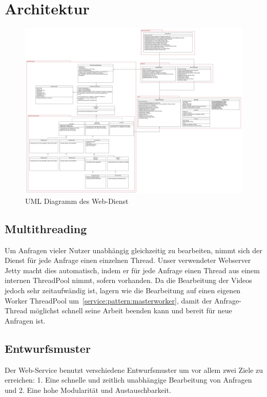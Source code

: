 \section{Architektur}

\begin{figure}[ht]
	\centering
\includegraphics[width=1\textwidth]{./resources/Diagramme/Webservice/UMLSERVERPCC.jpg}
\caption{UML Diagramm des Web-Dienst}
	\label{service:fig:modules_overview}
\end{figure}

\subsection{Multithreading}
Um Anfragen vieler Nutzer unabhängig gleichzeitig zu bearbeiten, nimmt sich der Dienst für jede Anfrage einen einzelnen Thread. Unser verwendeter Webserver Jetty macht dies automatisch, indem er für jede Anfrage einen Thread aus einem internen ThreadPool nimmt, sofern vorhanden.\newline
Da die Bearbeitung der Videos jedoch sehr zeitaufwändig ist, lagern wie die Bearbeitung auf einen eigenen Worker ThreadPool um~\eqref{service:pattern:masterworker}, damit der Anfrage-Thread möglichst schnell seine Arbeit beenden kann und bereit für neue Anfragen ist. 

\subsection{Entwurfsmuster} \label{service:pattern}
Der Web-Service benutzt verschiedene Entwurfsmuster um vor allem zwei Ziele zu erreichen: 1. Eine schnelle und zeitlich unabhängige Bearbeitung von Anfragen und 2. Eine hohe Modularität und Austauschbarkeit.


